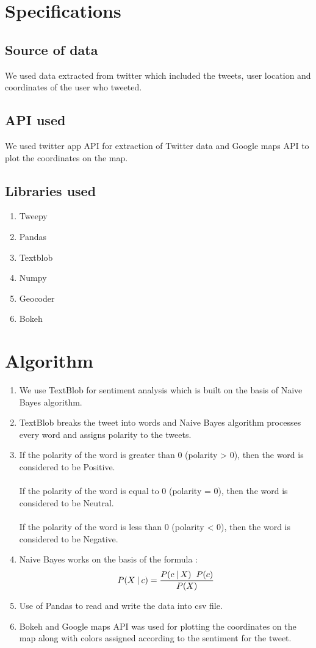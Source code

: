 \documentclass[12pt]{article}
\begin{document}
\section{Specifications}

\subsection{Source of data}

We used data extracted from twitter which included the tweets, user location and coordinates of the user who tweeted.
\subsection{API used}
We used twitter app API for extraction of Twitter data and Google maps API to plot the coordinates on the map. 

\subsection{Libraries used}
\begin{enumerate}
\item Tweepy
\item Pandas
\item Textblob
\item Numpy
\item Geocoder
\item Bokeh
\end{enumerate}
\newpage

\section{Algorithm}
\begin{enumerate}
\item  We use TextBlob for sentiment analysis which is built on the basis of Naive Bayes algorithm. 
\item TextBlob breaks the tweet into words and Naive Bayes algorithm processes every word and assigns polarity to the tweets.
\item If the polarity of the word is greater than 0 (polarity > 0), then the word is considered to be Positive. \\ \\
If the polarity of the word is equal to 0 (polarity = 0), then the word is considered to be Neutral.\\ \\
If the polarity of the word is less than 0 (polarity < 0), then the word is considered to be Negative.
\item Naive Bayes works on the basis of the formula :
\[ P(X \mathbin{\vert} c) =\frac {P(c \mathbin{\vert} X) \hspace{0.2cm} P(c)}{P(X)}\]
\item Use of Pandas to read and write the data into csv file.
\item Bokeh and Google maps API was used for plotting the coordinates on the map along with colors assigned according to the sentiment for the tweet.

\end{enumerate}
\newpage
\end{document}
